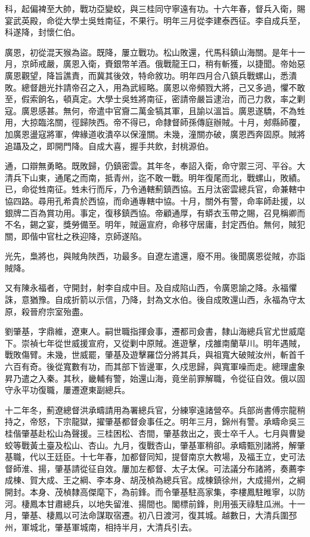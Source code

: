 \begin{pinyinscope}
科，起偏裨至大帥，戰功亞變蛟，與三桂同守寧遠有功。十六年春，督兵入衛，賜宴武英殿，命從大學士吳甡南征，不果行。明年三月從李建泰西征。李自成兵至，科遂降，封懷仁伯。

廣恩，初從混天猴為盜。既降，屢立戰功。松山敗還，代馬科鎮山海關。是年十一月，京師戒嚴，廣恩入衛，賚銀幣羊酒。俄戰龍王口，稍有斬獲，以捷聞。帝始惡廣恩觀望，降旨譙責，而冀其後效，特命敘功。明年四月合八鎮兵戰螺山，悉潰敗。總督趙光抃請帝召之入，用為武經略。廣恩以帝頻戮大將，己又多過，懼不敢至，假索餉名，頓真定。大學士吳甡將南征，密請帝嚴旨逮治，而己力救，率之剿寇。廣恩感甚。無何，帝遣中官齎二萬金犒其軍，且諭以溫旨。廣恩遂驕，不為甡用，大掠臨洺關，徑歸陜西。帝不得已，命隸督師孫傳庭辦賊。十月，郟縣師覆，加廣恩盪寇將軍，俾緣道收潰卒以保潼關。未幾，潼關亦破，廣恩西奔固原。賊將追躡及之，即開門降。自成大喜，握手共飲，封桃源伯。

通，口辯無勇略。既敗歸，仍鎮密雲。其年冬，奉詔入衛，命守禦三河、平谷。大清兵下山東，通尾之而南，抵青州，迄不敢一戰。明年復尾而北，戰螺山，敗績。已，命從甡南征。甡未行而斥，乃令通轄薊鎮西協。五月汰密雲總兵官，命兼轄中協四路。尋用孔希貴於西協，而命通專轄中協。十月，關外有警，命率師赴援，以銀牌二百為賞功用。事定，復移鎮西協。帝顧通厚，有蟒衣玉帶之賜，召見稱卿而不名，錫之宴，獎勞備至。明年，賊逼宣府，命移守居庸，封定西伯。無何，賊犯關，即偕中官杜之秩迎降，京師遂陷。

光先，梟將也，與賊角陜西，功最多。自遼左遣還，廢不用。後聞廣恩從賊，亦詣賊降。

又有陳永福者，守開封，射李自成中目。及自成陷山西，令廣恩諭之降。永福懼誅，意猶豫。自成折箭以示信，乃降，封為文水伯。後自成敗還山西，永福為守太原，殺晉府宗室殆盡。

劉肇基，字鼎維，遼東人。嗣世職指揮僉事，遷都司僉書，隸山海總兵官尤世威麾下。崇禎七年從世威援宣府，又從剿中原賊。進遊擊，戍雒南蘭草川。明年遇賊，戰敗傷臂。未幾，世威罷，肇基及遊擊羅岱分將其兵，與祖寬大破賊汝州，斬首千六百有奇。後從寬數有功，而其部下皆邊軍，久戍思歸，與寬軍噪而走。總理盧象昇乃遣之入秦。其秋，畿輔有警，始還山海，竟坐前罪解職，令從征自效。俄以固守永平功復職，屢遷遼東副總兵。

十二年冬，薊遼總督洪承疇請用為署總兵官，分練寧遠諸營卒。兵部尚書傅宗龍稍持之，帝怒，下宗龍獄，擢肇基都督僉事任之。明年三月，錦州有警。承疇命吳三桂偕肇基赴松山為聲援。三桂困松、杏間，肇基救出之，喪士卒千人。七月與曹變蛟等戰黃土臺及松山、杏山。九月，復戰杏山，肇基軍稍卻。承疇甄別諸將，解肇基職，代以王廷臣。十七年春，加都督同知，提督南京大教場，及福王立，史可法督師淮、揚，肇基請從征自效。屢加左都督、太子太保。可法議分布諸將，奏薦李成棟、賀大成、王之綱、李本身、胡茂楨為總兵官。成棟鎮徐州，大成揚州，之綱開封。本身、茂楨隸高傑麾下，為前鋒。而令肇基駐高家集，李樓鳳駐睢寧，以防河。棲鳳本甘肅總兵，以地失留淮、揚間也。閣標前鋒，則用張天祿駐瓜洲。十一月，肇基、棲鳳以可法命謀取宿遷。初八日渡河，復其城。越數日，大清兵圍邳州，軍城北，肇基軍城南，相持半月，大清兵引去。


\end{pinyinscope}
